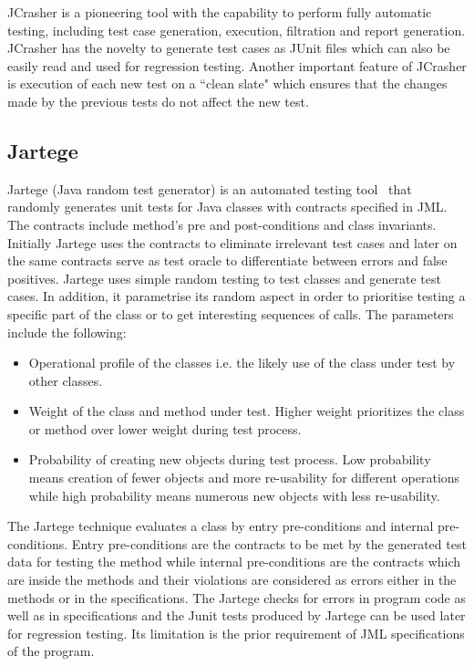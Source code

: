 JCrasher is a pioneering tool with the capability to perform fully automatic testing, including test case generation, execution, filtration and report generation. JCrasher has the novelty to generate test cases as JUnit files which can also be easily read and used for regression testing. Another important feature of JCrasher is execution of each new test on a ``clean slate" which ensures that the changes made by the previous tests do not affect the new test.  



\subsection{Jartege} \label{jartege_2}
Jartege (Java random test generator) is an automated testing tool~\cite{oriat2005jartege} that randomly generates unit tests for Java classes with contracts specified in JML. The contracts include method's pre and post-conditions and class invariants. Initially Jartege uses the contracts to eliminate irrelevant test cases and later on the same contracts serve as test oracle to differentiate between errors and false positives. Jartege uses simple random testing to test classes and generate test cases. In addition, it parametrise its random aspect in order to prioritise testing a specific part of the class or to get interesting sequences of calls. The parameters include the following: 

\begin{itemize}
\item Operational profile of the classes i.e. the likely use of the class under test by other classes.  
\item Weight of the class and method under test. Higher weight prioritizes the class or method over lower weight during test process. 
\item Probability of creating new objects during test process. Low probability means creation of fewer objects and more re-usability for different operations while high probability means numerous new objects with less re-usability.
\end{itemize}

The Jartege technique evaluates a class by entry pre-conditions and internal pre-conditions. Entry pre-conditions are the contracts to be met by the generated test data for testing the method while internal pre-conditions are the contracts which are inside the methods and their violations are considered as errors either in the methods or in the specifications. The Jartege checks for errors in program code as well as in specifications and the Junit tests produced by Jartege can be used later for regression testing. Its limitation is the prior requirement of JML specifications of the program.

